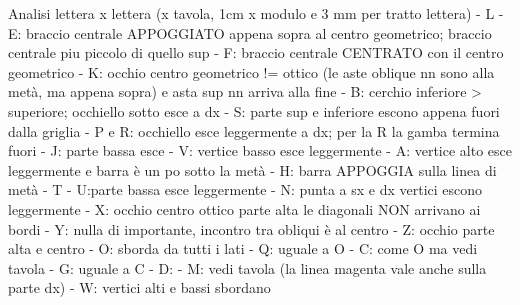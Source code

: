 Analisi lettera x lettera (x tavola, 1cm x modulo e 3 mm per tratto lettera)
- L
- E: braccio centrale APPOGGIATO appena sopra al centro geometrico; braccio centrale piu piccolo di quello sup
- F: braccio centrale CENTRATO con il centro geometrico
- K: occhio centro geometrico != ottico (le aste oblique nn sono alla metà, ma appena sopra) e asta sup nn arriva alla fine
- B: cerchio inferiore > superiore; occhiello sotto esce a dx
- S: parte sup e inferiore escono appena fuori dalla griglia
- P e R: occhiello esce leggermente a dx; per la R la gamba termina fuori
- J: parte bassa esce 
- V: vertice basso esce leggermente
- A: vertice alto esce leggermente e barra è un po sotto la metà
- H: barra APPOGGIA sulla linea di metà
- T
- U:parte bassa esce leggermente
- N: punta a sx e dx vertici escono leggermente
- X: occhio centro ottico parte alta le diagonali NON arrivano ai bordi
- Y: nulla di importante, incontro tra obliqui è al centro
- Z: occhio parte alta e centro
- O: sborda da tutti i lati
-  Q: uguale a O
- C: come O ma vedi tavola
- G: uguale a C
- D: 
- M: vedi tavola (la linea magenta vale anche sulla parte dx)
- W: vertici alti e bassi sbordano

